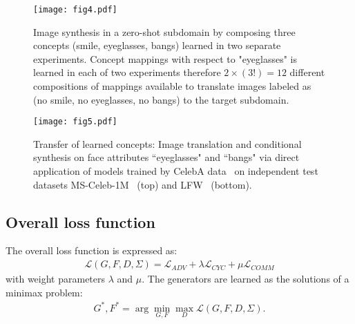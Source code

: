 \documentclass[10pt,twocolumn,letterpaper]{article}
\begin{document}
\begin{figure*}[!htb]
\begin{center}
\texttt{[image: fig4.pdf]}
\end{center}
   \caption{Image synthesis in a zero-shot subdomain by composing three concepts (smile, eyeglasses, bangs) learned in two separate experiments. Concept mappings with respect to "eyeglasses" is learned in each of two experiments therefore $2\times(3!)=12$ different compositions of mappings available to translate images labeled as (no smile, no eyeglasses, no bangs) to the target subdomain.}
\vspace{-2em}
\label{fig:3concept}
\end{figure*}


\begin{figure*}[!htb]
\begin{center}
\texttt{[image: fig5.pdf]}
\end{center}
   \caption{Transfer of learned concepts: Image translation and conditional synthesis on face attributes ``eyeglasses" and ``bangs" via direct application of models trained by CelebA data~\cite{celebA} on independent test datasets MS-Celeb-1M~\cite{msceleb} (top) and LFW~\cite{lfw} (bottom).}
\vspace{-1em}
\label{fig:msceleb-lfw}
\end{figure*}



\subsection{Overall loss function}
\label{sec:overallLoss}
The overall loss function is expressed as:\begin{align}
\mathcal{L}(G,F,D,\Sigma)=\mathcal{L}_{ADV}+\lambda\mathcal{L}_{CYC}+\mu\mathcal{L}_{COMM}
\end{align} with weight parameters $\lambda$ and $\mu$. The generators are learned as the solutions of a minimax problem:\begin{align}
G^*,F^*=\arg\min_{G,F}\max_{D}\mathcal{L}(G,F,D,\Sigma).
\end{align}
\end{document}
